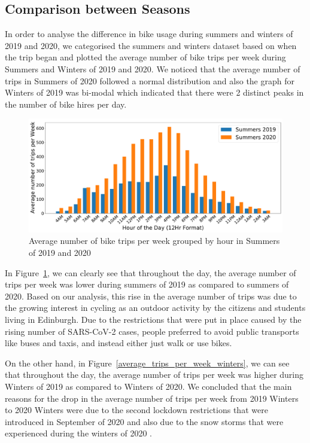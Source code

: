 \documentclass[11pt,a4paper]{article}
\begin{document}
\subsection{Comparison between Seasons}
\vspace{-5mm}
In order to analyse the difference in bike usage during summers and winters of 2019 and 2020, we categorised the summers and winters dataset based on when the trip began and plotted the average number of bike trips per week during Summers and Winters of 2019 and 2020. We noticed that the average number of trips in Summers of 2020 followed a normal distribution and also the graph for Winters of 2019 was bi-modal which indicated that there were 2 distinct peaks in the number of bike hires per day.
\par
\begin{figure}[h]
    \centering
    \includegraphics[width=\linewidth]{datasets/summers_weekly_bike_usage_by_hour.pdf}
    \caption{Average number of bike trips per week grouped by hour in Summers of 2019 and 2020}
    \label{average_trips_per_week_summers}
\end{figure}
In Figure~\ref{average_trips_per_week_summers}, we can clearly see that throughout the day, the average number of trips per week was lower during summers of 2019 as compared to summers of 2020. Based on our analysis, this rise in the average number of trips was due to the growing interest in cycling as an outdoor activity by the citizens and students living in Edinburgh. Due to the restrictions that were put in place caused by the rising number of SARS-CoV-2 cases, people preferred to avoid public transports like buses and taxis, and instead either just walk or use bikes. 
\par
On the other hand, in Figure~\ref{average_trips_per_week_winters}, we can see that throughout the day, the average number of trips per week was higher during Winters of 2019 as compared to Winters of 2020. We concluded that the main reasons for the drop in the average number of trips per week from 2019 Winters to 2020 Winters were due to the second lockdown restrictions that were introduced in September of 2020 and also due to the snow storms that were experienced during the winters of 2020 \cite{snow_storm}. 
\end{document}
